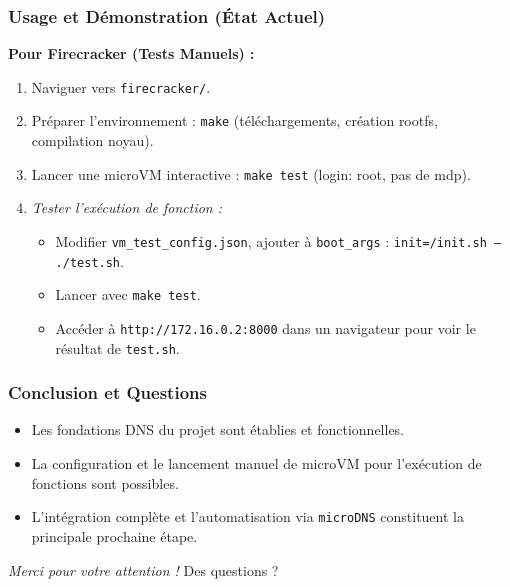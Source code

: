 \documentclass[12pt]{beamer}
\begin{document}
	\begin{frame}
		\frametitle{Usage et Démonstration (État Actuel)}
		\textbf{Pour Firecracker (Tests Manuels) :}
		\begin{enumerate}
			\item Naviguer vers \texttt{firecracker/}.
			\item Préparer l'environnement : \texttt{make} (téléchargements, création rootfs, compilation noyau).
			\item Lancer une microVM interactive : \texttt{make test} (login: root, pas de mdp).
			\item \textit{Tester l'exécution de fonction :}
			\begin{itemize}
				\item Modifier \texttt{vm\_test\_config.json}, ajouter à \texttt{boot\_args} : \texttt{init=/init.sh -- ./test.sh}.
				\item Lancer avec \texttt{make test}.
				\item Accéder à \texttt{http://172.16.0.2:8000} dans un navigateur pour voir le résultat de \texttt{test.sh}.
			\end{itemize}
		\end{enumerate}
	\end{frame}

	\begin{frame}
		\frametitle{Conclusion et Questions}
		\begin{itemize}
			\item Les fondations DNS du projet sont établies et fonctionnelles.
			\item La configuration et le lancement manuel de microVM pour l'exécution de fonctions sont possibles.
			\item L'intégration complète et l'automatisation via \texttt{microDNS} constituent la principale prochaine étape.
		\end{itemize}
		\vfill
		\centering
		\textit{Merci pour votre attention !}
		\vspace{1em}
		Des questions ?
	\end{frame}
\end{document}
